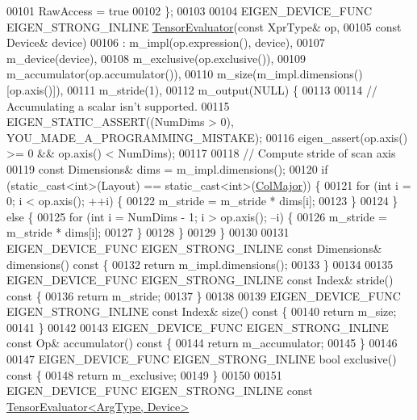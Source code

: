 \begin{DoxyCode}
00101     RawAccess = \textcolor{keyword}{true}
00102   \};
00103 
00104   EIGEN\_DEVICE\_FUNC EIGEN\_STRONG\_INLINE \hyperlink{struct_eigen_1_1_tensor_evaluator}{TensorEvaluator}(\textcolor{keyword}{const} XprType& op,
00105                                                         \textcolor{keyword}{const} Device& device)
00106       : m\_impl(op.expression(), device),
00107         m\_device(device),
00108         m\_exclusive(op.exclusive()),
00109         m\_accumulator(op.accumulator()),
00110         m\_size(m\_impl.dimensions()[op.axis()]),
00111         m\_stride(1),
00112         m\_output(NULL) \{
00113 
00114     \textcolor{comment}{// Accumulating a scalar isn't supported.}
00115     EIGEN\_STATIC\_ASSERT((NumDims > 0), YOU\_MADE\_A\_PROGRAMMING\_MISTAKE);
00116     eigen\_assert(op.axis() >= 0 && op.axis() < NumDims);
00117 
00118     \textcolor{comment}{// Compute stride of scan axis}
00119     \textcolor{keyword}{const} Dimensions& dims = m\_impl.dimensions();
00120     \textcolor{keywordflow}{if} (static\_cast<int>(Layout) == static\_cast<int>(\hyperlink{group__enums_ggaacded1a18ae58b0f554751f6cdf9eb13a0cbd4bdd0abcfc0224c5fcb5e4f6669a}{ColMajor})) \{
00121       \textcolor{keywordflow}{for} (\textcolor{keywordtype}{int} i = 0; i < op.axis(); ++i) \{
00122         m\_stride = m\_stride * dims[i];
00123       \}
00124     \} \textcolor{keywordflow}{else} \{
00125       \textcolor{keywordflow}{for} (\textcolor{keywordtype}{int} i = NumDims - 1; i > op.axis(); --i) \{
00126         m\_stride = m\_stride * dims[i];
00127       \}
00128     \}
00129   \}
00130 
00131   EIGEN\_DEVICE\_FUNC EIGEN\_STRONG\_INLINE \textcolor{keyword}{const} Dimensions& dimensions()\textcolor{keyword}{ const }\{
00132     \textcolor{keywordflow}{return} m\_impl.dimensions();
00133   \}
00134 
00135   EIGEN\_DEVICE\_FUNC EIGEN\_STRONG\_INLINE \textcolor{keyword}{const} Index& stride()\textcolor{keyword}{ const }\{
00136     \textcolor{keywordflow}{return} m\_stride;
00137   \}
00138 
00139   EIGEN\_DEVICE\_FUNC EIGEN\_STRONG\_INLINE \textcolor{keyword}{const} Index& size()\textcolor{keyword}{ const }\{
00140     \textcolor{keywordflow}{return} m\_size;
00141   \}
00142 
00143   EIGEN\_DEVICE\_FUNC EIGEN\_STRONG\_INLINE \textcolor{keyword}{const} Op& accumulator()\textcolor{keyword}{ const }\{
00144     \textcolor{keywordflow}{return} m\_accumulator;
00145   \}
00146 
00147   EIGEN\_DEVICE\_FUNC EIGEN\_STRONG\_INLINE \textcolor{keywordtype}{bool} exclusive()\textcolor{keyword}{ const }\{
00148     \textcolor{keywordflow}{return} m\_exclusive;
00149   \}
00150 
00151   EIGEN\_DEVICE\_FUNC EIGEN\_STRONG\_INLINE \textcolor{keyword}{const} \hyperlink{struct_eigen_1_1_tensor_evaluator}{TensorEvaluator<ArgType, Device>}

\end{DoxyCode}
